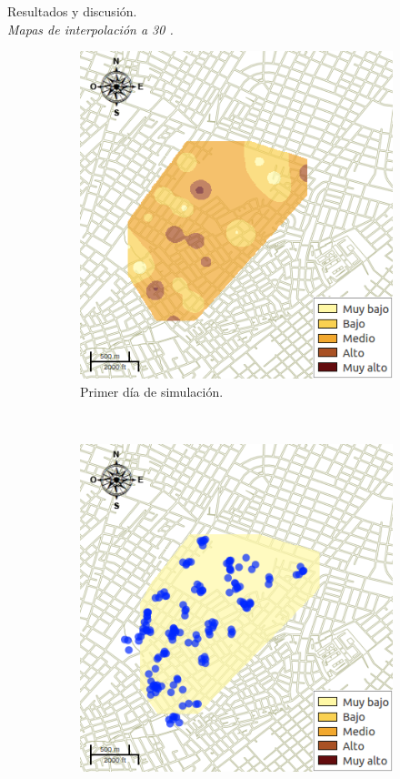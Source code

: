 \begin{frame}[t]{Resultados y discusión.\\\textit{Mapas de interpolación a 30 \textcelsius.}}
    \begin{figure}
    \begin{subfigure}[b]{0.45\textwidth}
        \includegraphics[width=\textwidth]{../book/capitulo-6/graphics/raster/temp-30-0.png}
        \caption{Primer día de simulación.}
    \end{subfigure}
    ~~~~
    \begin{subfigure}[b]{0.45\textwidth}
        \includegraphics[width=\textwidth]{../book/capitulo-6/graphics/raster/temp-30-9.png}

\end{subfigure}
\end{figure}
\end{frame}
